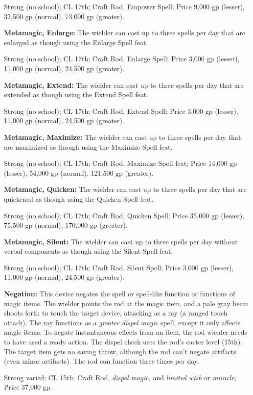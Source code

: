 Strong (no school); CL 17th; Craft Rod, Empower Spell; Price 9,000 gp (lesser), 
32,500 gp (normal), 73,000 gp (greater).

\textbf{Metamagic, Enlarge:} The wielder can cast up to three spells per day that 
are enlarged as though using the Enlarge Spell feat.

Strong (no school); CL 17th; Craft Rod, Enlarge Spell; Price 3,000 gp (lesser), 
11,000 gp (normal), 24,500 gp (greater).

\textbf{Metamagic, Extend: }The wielder can cast up to three spells per day that 
are extended as though using the Extend Spell feat.

Strong (no school); CL 17th; Craft Rod, Extend Spell; Price 3,000 gp (lesser), 
11,000 gp (normal), 24,500 gp (greater).

\textbf{Metamagic, Maximize:} The wielder can cast up to three spells per day that 
are maximized as though using the Maximize Spell feat.

Strong (no school); CL 17th; Craft Rod, Maximize Spell feat; Price 14,000 gp (lesser), 
54,000 gp (normal), 121,500 gp (greater).

\textbf{Metamagic, Quicken:} The wielder can cast up to three spells per day that 
are quickened as though using the Quicken Spell feat.

Strong (no school); CL 17th; Craft Rod, Quicken Spell; Price 35,000 gp (lesser), 
75,500 gp (normal), 170,000 gp (greater).

\textbf{Metamagic, Silent:} The wielder can cast up to three spells per day without 
verbal components as though using the Silent Spell feat.

Strong (no school); CL 17th; Craft Rod, Silent Spell; Price 3,000 gp (lesser), 
11,000 gp (normal), 24,500 gp (greater).

\textbf{Negation: }This device negates the spell or spell-like function or functions 
of magic items. The wielder points the rod at the magic item, and a pale gray beam 
shoots forth to touch the target device, attacking as a ray (a ranged touch attack). 
The ray functions as a \textit{greater dispel magic }spell, except it only affects 
magic items. To negate instantaneous effects from an item, the rod wielder needs 
to have used a ready action. The dispel check uses the rod's caster level (15th). 
The target item gets no saving throw, although the rod can't negate artifacts (even 
minor artifacts). The rod can function three times per day.

Strong varied; CL 15th; Craft Rod, \textit{dispel magic, }and \textit{limited wish 
}or \textit{miracle; }Price 37,000 gp.

